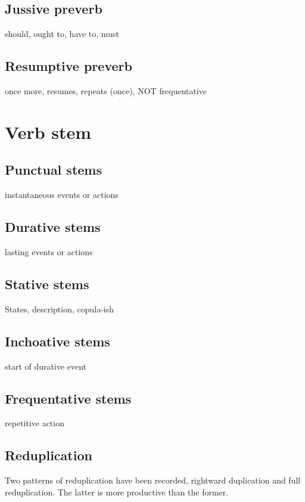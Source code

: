 \documentclass[executivepaper,10pt,twoside,openany,draft]{memoir}
\begin{document}
\subsection{Jussive preverb}

should, ought to, have to, must

\subsection{Resumptive preverb}

once more, resumes, repeats (once), NOT frequentative

\section{Verb stem}

\subsection{Punctual stems}

instantaneous events or actions

\subsection{Durative stems}

lasting events or actions

\subsection{Stative stems}

States, description, copula-ish

\subsection{Inchoative stems}

start of durative event

\subsection{Frequentative stems}

repetitive action

\subsection{Reduplication}

Two patterns of reduplication have been recorded, rightward duplication and full reduplication. The latter is more productive than the former.
\end{document}

